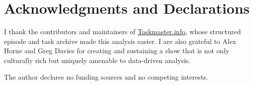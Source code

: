 \documentclass[10pt,letterpaper]{article}
\begin{document}
\section*{Acknowledgments and Declarations}

I thank the contributors and maintainers of \href{https://taskmaster.info}{Taskmaster.info}, whose structured episode and task archive made this analysis easier. I are also grateful to Alex Horne and Greg Davies for creating and sustaining a show that is not only culturally rich but uniquely amenable to data-driven analysis.

The author declares no funding sources and no competing interests.

\nolinenumbers

%
%
% 
\end{document}

